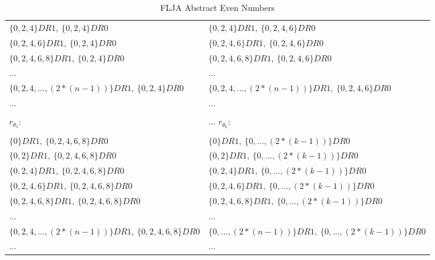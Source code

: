 \begin{table}[h!]
\begin{center}
\begin{tabular}{|l||l|}
				$\{0, 2, 4\}DR1,\:\{0, 2, 4\}DR0$ &
				$\{0, 2, 4\}DR1,\:\{0, 2, 4, 6\}DR0$ \\
				$\{0, 2, 4, 6\}DR1,\:\{0, 2, 4\}DR0$ &
				$\{0, 2, 4, 6\}DR1,\:\{0, 2, 4, 6\}DR0$ \\
				$\{0, 2, 4, 6, 8\}DR1,\:\{0, 2, 4\}DR0$ &
				$\{0, 2, 4, 6, 8\}DR1,\:\{0, 2, 4, 6\}DR0$ \\
				... & ... \\
				$\{0, 2, 4, ... , (2*(n-1))\}DR1,\:\{0, 2, 4\}DR0$ &
				$\{0, 2, 4, ... , (2*(n-1))\}DR1,\:\{0, 2, 4, 6\}DR0$ \\
				... & ... \\				
				\hline
				\hline
				\cellcolor{airforceblue!50} & \cellcolor{airforceblue!50}  \\
				\cellcolor{airforceblue!50} {\LARGE $r_{\theta_{5}}$:  } & \cellcolor{airforceblue!50}... {\LARGE $r_{\theta_{k}}$:  } \\
				\cellcolor{airforceblue!50} & \cellcolor{airforceblue!50}  \\
				\hline
				\hline
				$\{0\}DR1,\:\{0, 2, 4, 6, 8\}DR0$ &
				$\{0\}DR1,\:\{0, ... , (2*(k-1))\}DR0$ \\
				$\{0, 2\}DR1,\:\{0, 2, 4, 6, 8\}DR0$ &
				$\{0, 2\}DR1,\:\{0, ... , (2*(k-1))\}DR0$ \\
				$\{0, 2, 4\}DR1,\:\{0, 2, 4, 6, 8\}DR0$ &
				$\{0, 2, 4\}DR1,\:\{0, ... , (2*(k-1))\}DR0$ \\
				$\{0, 2, 4, 6\}DR1,\:\{0, 2, 4, 6, 8\}DR0$ &
				$\{0, 2, 4, 6\}DR1,\:\{0, ... , (2*(k-1))\}DR0$ \\
				$\{0, 2, 4, 6, 8\}DR1,\:\{0, 2, 4, 6, 8\}DR0$ &
				$\{0, 2, 4, 6, 8\}DR1,\:\{0, ... , (2*(k-1))\}DR0$ \\
				... & ... \\
				$\{0, 2, 4, ... , (2*(n-1))\}DR1,\:\{0, 2, 4, 6, 8\}DR0$ &
				$\{0, ... , (2*(n-1))\}DR1,\:\{0, ... , (2*(k-1))\}DR0$ \\
				... & ... \\
				\hline
			\end{tabular}
			\caption{FLJA Abstract Even Numbers}
			\label{tab:flja_snei_evens}
		\end{center}
	\end{table}

